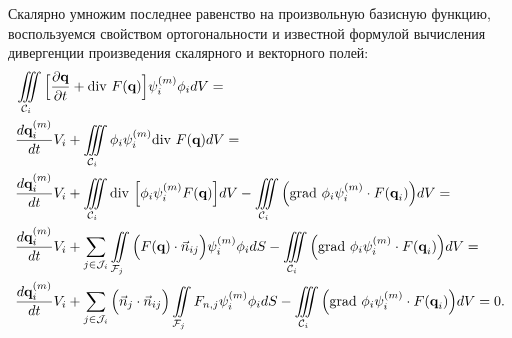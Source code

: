 \documentclass[14pt, a4paper, fleqn]{extreport}
\begin{document}
	Скалярно умножим последнее равенство на произвольную базисную функцию,
	воспользуемся свойством ортогональности и известной формулой вычисления 
	дивергенции произведения скалярного и векторного полей:
	\begin{equation}
	\label{hyperb_eqs_int_dg}
	\begin{split}
		&\iiint\limits_{\mathcal{C}_i} \Big[
			\dfrac{\partial \textbf{q}}{\partial t} + \text{div }{F(\textbf{q})} \Big]\psi_i^{(m)} \phi_i dV = 
		\\
		&\dfrac{d \textbf{q}_i^{(m)}}{d t}V_i 
			+ \iiint\limits_{\mathcal{C}_i} \phi_i \psi_i^{(m)} \text{div }{F(\textbf{q})} dV =
		\\
		&\dfrac{d \textbf{q}_i^{(m)}}{d t}V_i 
			+ \iiint\limits_{\mathcal{C}_i} \text{div }{\Big[ \phi_i \psi_i^{(m)} F(\textbf{q}) \Big]} dV
			- \iiint\limits_{\mathcal{C}_i} \Big( \text{grad }{\phi_i \psi_i^{(m)}} \cdot F(\textbf{q}_i) \Big) dV = 
		\\
		&\dfrac{d \textbf{q}_i^{(m)}}{d t}V_i 
			+ \sum\limits_{j \in \mathcal{J}_i}\iint\limits_{\mathcal{F}_j} 
				\Big( F(\textbf{q}) \cdot \vec{n}_{ij} \Big) \psi_i^{(m)} \phi_i dS
			- \iiint\limits_{\mathcal{C}_i} \Big( \text{grad }{\phi_i \psi_i^{(m)}} \cdot F(\textbf{q}_i) \Big) dV = 
		\\
		&\dfrac{d \textbf{q}_i^{(m)}}{d t}V_i 
			+ \sum\limits_{j \in \mathcal{J}_i} 
				\Big( \vec{n}_{j} \cdot \vec{n}_{ij} \Big) \iint\limits_{\mathcal{F}_j} F_{n,j} \psi_i^{(m)} \phi_i dS
			- \iiint\limits_{\mathcal{C}_i} \Big( \text{grad }{\phi_i \psi_i^{(m)}} \cdot F(\textbf{q}_i) \Big) dV 
			= 0. 
	\end{split}
	\end{equation}
	
	
\end{document}
